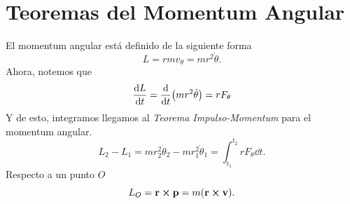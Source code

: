 \section{Teoremas del Momentum Angular}
El momentum angular está definido de la siguiente forma
\begin{equation}
L = rmv_\theta = mr^2 \dot{\theta}.
\end{equation}
Ahora, notemos que 
\begin{equation}
	\dv{L}{t} = \dv{t} (mr^2 \dot{\theta}) = rF_\theta
\end{equation}
Y de esto, integramos llegamos al \textit{Teorema Impulso-Momentum} para el momentum angular.
\begin{equation}
	L_2 - L_1 = mr_2 ^2 \dot{\theta} _2 - mr_1 ^2 \dot{\theta} _1 = \int _{t_1} ^{t_2} rF_\theta \dd{t}.
\end{equation}
Respecto a un punto $O$
\begin{equation}
	L_O = \vb{r} \cp \vb{p} = m\qty(\vb{r} \cp \vb{v}).
\end{equation}


